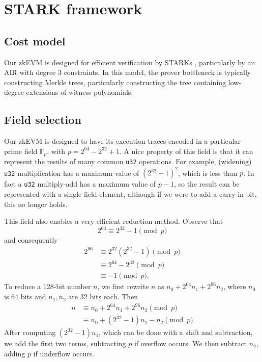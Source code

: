 \section{STARK framework}
\label{framework}


\subsection{Cost model}

Our zkEVM is designed for efficient verification by STARKs \cite{stark}, particularly by an AIR with degree 3 constraints. In this model, the prover bottleneck is typically constructing Merkle trees, particularly constructing the tree containing low-degree extensions of witness polynomials.


\subsection{Field selection}
\label{field}
Our zkEVM is designed to have its execution traces encoded in a particular prime field $\mathbb{F}_p$, with $p = 2^{64} - 2^{32} + 1$. A nice property of this field is that it can represent the results of many common \texttt{u32} operations. For example, (widening) \texttt{u32} multiplication has a maximum value of $(2^{32} - 1)^2$, which is less than $p$. In fact a \texttt{u32} multiply-add has a maximum value of $p - 1$, so the result can be represented with a single field element, although if we were to add a carry in bit, this no longer holds.

This field also enables a very efficient reduction method. Observe that
$$
2^{64} \equiv 2^{32} - 1 \pmod p
$$
and consequently
\begin{align*}
  2^{96} &\equiv 2^{32} (2^{32} - 1) \pmod p \\
         &\equiv 2^{64} - 2^{32} \pmod p \\
         &\equiv -1 \pmod p.
\end{align*}
To reduce a 128-bit number $n$, we first rewrite $n$ as $n_0 + 2^{64} n_1 + 2^{96} n_2$, where $n_0$ is 64 bits and $n_1, n_2$ are 32 bits each. Then
\begin{align*}
  n &\equiv n_0 + 2^{64} n_1 + 2^{96} n_2 \pmod p \\
  &\equiv n_0 + (2^{32} - 1) n_1 - n_2 \pmod p
\end{align*}
After computing $(2^{32} - 1) n_1$, which can be done with a shift and subtraction, we add the first two terms, subtracting $p$ if overflow occurs. We then subtract $n_2$, adding $p$ if underflow occurs.

